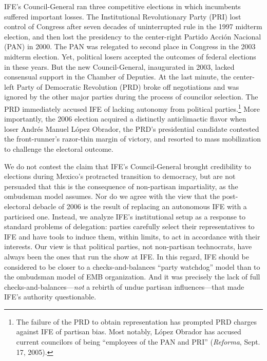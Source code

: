 \documentclass[12 pt, letter]{article}
\begin{document}
IFE's Council-General ran three competitive elections in which
incumbents suffered important losses. The Institutional
Revolutionary Party (PRI) lost control of Congress after seven
decades of uninterrupted rule in the 1997 midterm election, and then
lost the presidency to the center-right Partido Acci\'on Nacional
(PAN) in 2000. The PAN was relegated to second place in Congress in
the 2003 midterm election. Yet, political losers accepted the
outcomes of federal elections in these years.  But the new
Council-General, inaugurated in 2003, lacked consensual support in
the Chamber of Deputies.  At the last minute, the center-left Party
of Democratic Revolution (PRD) broke off negotiations and was
ignored by the other major parties during the process of  councilor
selection.  The PRD immediately accused IFE of lacking autonomy from
political parties.\footnote{The failure of the PRD to obtain
representation has prompted PRD charges against IFE of partisan
bias.  Most notably, L\'opez Obrador has accused current councilors
of being ``employees of the PAN and PRI'' (\emph{Reforma}, Sept. 17,
2005).}  More importantly, the 2006 election acquired a distinctly
anticlimactic flavor when loser Andr\'es Manuel L\'opez Obrador, the
PRD's presidential candidate contested the front-runner's razor-thin
margin of victory, and resorted to mass mobilization to challenge
the electoral outcome.

We do not contest the claim that IFE's Council-General brought
credibility to elections during Mexico's protracted transition to
democracy, but are not persuaded that this is the consequence of
non-partisan impartiality, as the ombudsman model assumes.    Nor do
we agree with the view that the  post-electoral debacle of 2006 is
the result of replacing an autonomous IFE with a particised one.
Instead, we analyze IFE's institutional setup as a response to
standard problems of delegation: parties carefully select their
representatives to IFE and have tools to induce them, within limits,
to act in accordance with their interests. Our view is that
political parties, not non-partisan technocrats, have always been
the ones that run the show at IFE.  In this regard, IFE should be
considered to be closer to a checks-and-balances ``party watchdog''
model than to the ombudsman model of EMB organization.  And it was
precisely the lack of full checks-and-balances---\emph{not} a
rebirth of undue partisan influences---that made IFE's authority
questionable.
\end{document}
